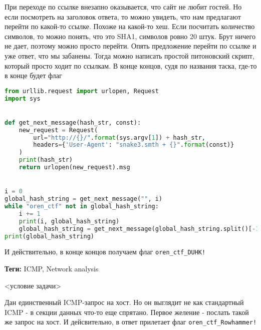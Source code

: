 \documentclass[idxtotoc,hyperref,openany,oneside]{files/admin} %
\begin{document}
При переходе по ссылке внезапно оказывается, что сайт не любит гостей. Но если посмотреть на заголовок ответа, то можно увидеть, что нам предлагают перейти по какой-то ссылке. Похоже на какой-то хеш. Если посчитать количество символов, то можно понять, что это SHA1, символов ровно 20 штук. Брут ничего не дает, поэтому можно просто перейти. Опять предложение перейти по ссылке и уже ответ, что мы забанены. Тогда можно написать простой питоновский скрипт, который просто ходит по ссылкам. В конце концов, судя по названия таска, где-то в конце будет флаг
\begin{lstlisting}[language=Python]
from urllib.request import urlopen, Request
import sys


def get_next_message(hash_str, const):
    new_request = Request(
        url="http://{}/".format(sys.argv[1]) + hash_str,
        headers={'User-Agent': "snake3.smth + {}".format(const)}
    )
    print(hash_str)
    return urlopen(new_request).msg


i = 0
global_hash_string = get_next_message("", i)
while "oren_ctf" not in global_hash_string:
    i += 1
    print(i, global_hash_string)
    global_hash_string = get_next_message(global_hash_string.split()[-1], i)
print(global_hash_string)
\end{lstlisting}

И действительно, в конце концов получаем флаг \verb|oren_ctf_DUHK!|




\textbf{Теги:} ICMP, Network analysis\vspace{\baselineskip}

\begin{tcolorbox}
<условие задачи>
\end{tcolorbox}

Дан единственный ICMP-запрос на хост. Но он выглядит не как стандартный ICMP - в секции данных что-то еще спрятано. Первое желение - послать такой же запрос на хост. И дейсвительно, в ответ прилетает флаг \verb|oren_ctf_Rowhammer!|

\end{document}
